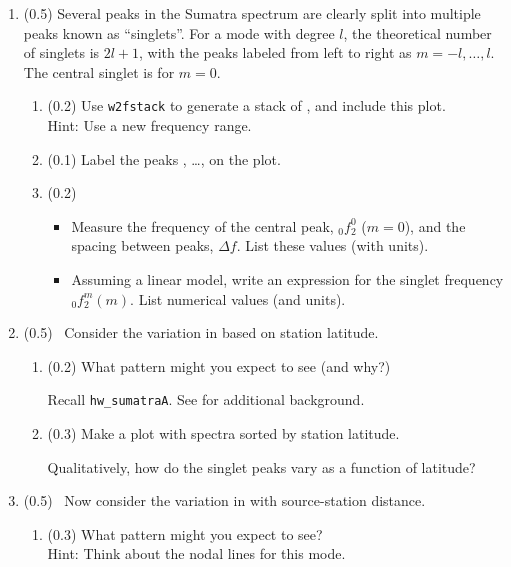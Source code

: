 \documentclass[11pt,titlepage,fleqn]{article}
\begin{document}
\begin{enumerate}
\item (0.5) Several peaks in the Sumatra spectrum are clearly split into multiple peaks known as ``singlets''. For a mode with degree $l$, the theoretical number of singlets is $2l+1$, with the peaks labeled from left to right as $m = -l,\ldots,l$. The central singlet is for $m=0$.
%
\begin{enumerate}
\item (0.2) Use \verb+w2fstack+ to generate a stack of , and include this plot. \\
Hint: Use a new frequency range.
\item (0.1) Label the peaks , \ldots,  on the plot.
\item (0.2) 
\begin{itemize}
\item Measure the frequency of the central peak, $_0f_2^0$ ($m=0$), and the spacing between peaks, $\Delta f$. List these values (with units).
\item Assuming a linear model, write an expression for the singlet frequency $_0f_2^m(m)$. List numerical values (and units).
\end{itemize}
\end{enumerate}


\item (0.5) \ptag\ Consider the variation in  based on station latitude.
%
\begin{enumerate}
\item (0.2) What pattern might you expect to see (and why?)

Recall \verb+hw_sumatraA+.
See \citet[][Figure 3]{SSteinOkal2007} for additional background.

\item (0.3) Make a plot with   spectra sorted by station latitude.

Qualitatively, how do the singlet peaks vary as a function of latitude?

\end{enumerate}


\item (0.5) \ptag\ Now consider the variation in  with source-station distance.
%
\begin{enumerate}
\item (0.3) What pattern might you expect to see? \\
Hint: Think about the nodal lines for this mode.


\end{enumerate}
\end{enumerate}
\end{document}

